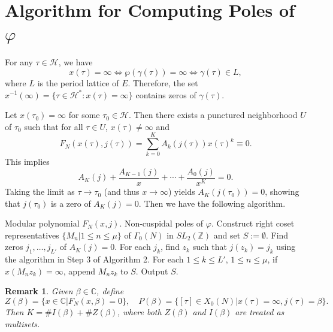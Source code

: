 \documentclass[10pt, a4paper]{article}
\newtheorem{remark}[theorem]{Remark}
\begin{document}
\section{Algorithm for Computing Poles of $\varphi$}

For any $\tau \in \mathcal{H}$, we have
\[
x(\tau) = \infty \iff \wp(\gamma(\tau)) = \infty \iff \gamma(\tau) \in L,
\]
where $L$ is the period lattice of $E$. Therefore, the set $x^{-1}(\infty) = \{\tau \in \mathcal{H}^{*} : x(\tau) = \infty\}$ contains zeros of $\gamma(\tau)$.


Let $x(\tau_0) = \infty$ for some $\tau_0 \in \mathcal{H}$. Then there exists a punctured neighborhood $U$ of $\tau_0$ such that for all $\tau \in U$, $x(\tau ) \ne \infty $ and
\[
F_N(x(\tau), j(\tau)) = \sum_{k=0}^K A_k(j(\tau))x(\tau)^k  \equiv 0.
\]
This implies
\[
A_K(j) + \frac{A_{K-1}(j)}{x} + \cdots + \frac{A_0(j)}{x^K} = 0.
\]
Taking the limit as $\tau \to \tau_0$ (and thus $x \to \infty$) yields $A_K(j(\tau_0)) = 0$, showing that
$j(\tau_0)$ is a zero of $A_K(j) = 0$. Then we have the following algorithm.

\begin{algorithm}[H]
\caption{Computation of Non-Cuspidal Poles of $\varphi$}
\begin{algorithmic}[1]
\REQUIRE Modular polynomial $F_N(x,j)$.
\ENSURE Non-cuspidal poles of $\varphi$.
\STATE Construct right coset representatives $\{M_n | 1 \leq n \leq \mu\}$ of $\Gamma_0(N)$ in $SL_2(\mathbb{Z})$ and set  $S:=\emptyset$.
\STATE Find zeros $j_1, \ldots, j_{L'}$ of $A_K(j) = 0$.
\STATE  For each $j_k$,  find $z_k$ such that $j(z_k) = j_k$ using  the algorithm in Step 3 of Algorithm 2.
\STATE    For each  $1 \leq k \leq L'$, $1 \leq n \leq \mu$,
          if $x(M_n z_k) = \infty$,  append $M_n z_k$ to $S$.
\STATE   Output $S$.
\end{algorithmic}
\end{algorithm}

\begin{remark}
Given $\beta \in \mathbb{C}$, define
\[
Z(\beta) = \{x \in \mathbb{C} | F_N(x,\beta) = 0\}, \quad
P(\beta) = \{[\tau] \in X_0(N) | x(\tau) = \infty, j(\tau) = \beta\}.
\]
Then $K = \# I(\beta) + \# Z(\beta)$, where both $Z(\beta)$ and $I(\beta)$ are treated as multisets.
\end{remark}
\end{document}
